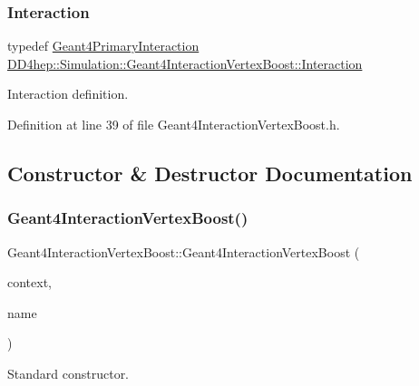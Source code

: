 \subsubsection{\texorpdfstring{Interaction}{Interaction}}
{\footnotesize\ttfamily typedef \hyperlink{class_d_d4hep_1_1_simulation_1_1_geant4_primary_interaction}{Geant4\+Primary\+Interaction} \hyperlink{class_d_d4hep_1_1_simulation_1_1_geant4_interaction_vertex_boost_a24539ccb7908e132acaf99eeec5111e5}{D\+D4hep\+::\+Simulation\+::\+Geant4\+Interaction\+Vertex\+Boost\+::\+Interaction}}



Interaction definition. 



Definition at line 39 of file Geant4\+Interaction\+Vertex\+Boost.\+h.



\subsection{Constructor \& Destructor Documentation}
\hypertarget{class_d_d4hep_1_1_simulation_1_1_geant4_interaction_vertex_boost_a244dd1d7ef8eee7b9ee8a40a09a1963d}{}\label{class_d_d4hep_1_1_simulation_1_1_geant4_interaction_vertex_boost_a244dd1d7ef8eee7b9ee8a40a09a1963d} 
\subsubsection{\texorpdfstring{Geant4\+Interaction\+Vertex\+Boost()}{Geant4InteractionVertexBoost()}}
{\footnotesize\ttfamily Geant4\+Interaction\+Vertex\+Boost\+::\+Geant4\+Interaction\+Vertex\+Boost (\begin{DoxyParamCaption}\item[{\hyperlink{class_d_d4hep_1_1_simulation_1_1_geant4_context}{Geant4\+Context} $\ast$}]{context,  }\item[{const std\+::string \&}]{name }\end{DoxyParamCaption})}



Standard constructor. 



